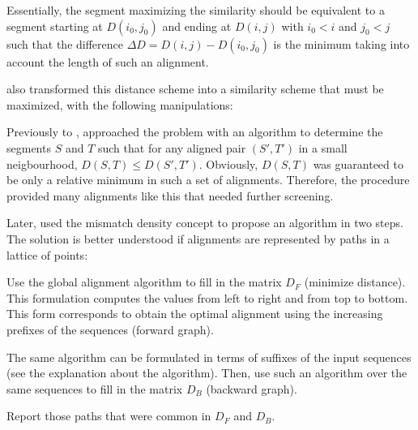 Essentially, the segment maximizing the similarity should be equivalent to a segment starting at 
$D(i_0,j_0)$ and ending at $D(i,j)$ with $i_0 < i$ and $j_0 < j$ such that the difference 
$\Delta D = D(i,j) - D(i_0,j_0)$ is the minimum taking into account the length of such an alignment.

\citeauthor{goad:1982a} also transformed this distance scheme into a similarity scheme that must be
maximized, with the following manipulations:

\begin{center}
\end{center}



Previously to \citet{goad:1982a}, \citet{sellers:1980a} approached the problem with an algorithm to
determine the segments $S$ and $T$ such that for any aligned pair $(S',T')$ in a small neigbourhood,
$D(S,T) \leq D(S',T')$. Obviously, $D(S,T)$ was guaranteed to be only a relative minimum in such
a set of alignments. Therefore, the procedure provided many alignments like this that needed further
screening.

Later, \citeauthor{goad:1982a} used the mismatch density concept to propose an algorithm in two steps. 
The solution is better understood if alignments are represented by paths in a lattice of points:

\begin{menumerate}
\item
Use the \citeauthor{sellers:1974a} global alignment algorithm to fill in the matrix $D_F$ (minimize 
distance). This formulation computes the values from left to right and from top to bottom. This form 
corresponds to obtain the optimal alignment using the increasing prefixes of the sequences (forward graph).
\item
The same algorithm can be formulated in terms of suffixes of the input sequences (see the explanation about 
the \citeauthor{hirschberg:1975a} algorithm). Then, use such an algorithm over the same sequences to fill in the 
matrix $D_B$ (backward graph).
\item
Report those paths that were common in $D_F$ and $D_B$.
\end{menumerate}

